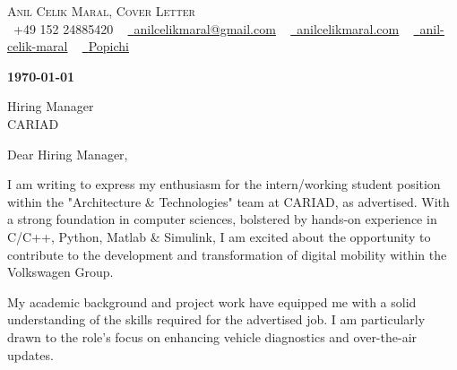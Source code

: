 \documentclass[11pt,a4paper]{article}
\begin{document}
\begin{center}
    {\Huge \scshape Anil Celik Maral, Cover Letter} \\ \vspace{1pt}
    \small \raisebox{-0.1\height}\faPhone\ +49 152 24885420 ~ \href{mailto:anilcelikmaral@gmail.com}{\raisebox{-0.2\height}\faEnvelope\  \underline{anilcelikmaral@gmail.com}} ~ 
    \href{https://anilcelikmaral.com/}{\raisebox{-0.2\height}\faGlobe\ \underline{anilcelikmaral.com}}  ~
    \href{https://www.linkedin.com/in/anil-celik-maral/}{\raisebox{-0.2\height}\faLinkedin\ \underline{anil-celik-maral}}  ~
    \href{https://github.com/Popichi}{\raisebox{-0.2\height}\faGithub\ \underline{Popichi}}
\end{center}

\vspace{10pt}

\begin{flushleft}
\textbf{\today}
\end{flushleft}

\begin{flushleft}
Hiring Manager\\
CARIAD\\
\end{flushleft}

\vspace{-15pt}

\begin{flushleft}
Dear Hiring Manager,
\end{flushleft}

\begin{flushleft}

I am writing to express my enthusiasm for the intern/working student position 
within the "Architecture \& Technologies" team at CARIAD, as advertised. With 
a strong foundation in computer sciences, bolstered by hands-on experience in 
C/C++, Python, Matlab \& Simulink, I am excited about the opportunity to 
contribute to the development and transformation of digital mobility within 
the Volkswagen Group.
    
\end{flushleft}

\begin{flushleft}
My academic background and project work have equipped me with a solid 
understanding of the skills required for the advertised job. I am particularly 
drawn to the role’s focus on enhancing vehicle diagnostics and over-the-air 
updates.
\end{flushleft}
\end{document}
